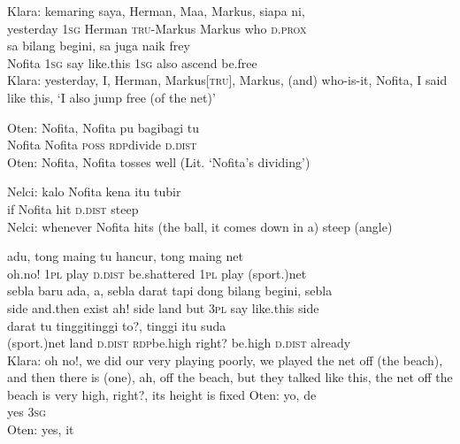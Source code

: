 \ea
\gll   Klara:    {kemaring}    {saya,}    {Herman,}    {Maa,}    {Markus,}   siapa   ni,\\
 {}     {yesterday}    {\textsc{1sg}}    {Herman}    {\textsc{tru-}Markus}    {Markus}   who   \textsc{d.prox}\\
   sa    {bilang}    {begini,}    {sa}   juga    {naik}    {frey}\\
   {Nofita}   \textsc{1sg}    {say}    {like.this}    {\textsc{1sg}}   also    {ascend}    {be.free}\\
\glt
Klara: yesterday, I, Herman, Markus[\textsc{tru}], Markus, (and) who-is-it, Nofita, I said like this, ‘I also jump free (of the net)’
\z

\ea
\gll   Oten:   Nofita,   Nofita   pu   bagi{\Tilde}bagi   tu\\
  {}   Nofita   Nofita   \textsc{poss}   \textsc{rdp}{\Tilde}divide   \textsc{d.dist}\\
\glt
Oten: Nofita, Nofita tosses well (Lit. ‘Nofita’s dividing’)
\z

\ea
\gll   Nelci:   kalo   Nofita   kena   itu   tubir\\
 {}    if   Nofita   hit   \textsc{d.dist}   steep\\
\glt
Nelci: whenever Nofita hits (the ball, it comes down in a) steep (angle)
\z

\ea
{}    {adu,}    {tong}    {maing}    {tu}    {hancur,}    {tong}    {maing}    {net}\\
   {}    {oh.no!}    {\textsc{1pl}}    {play}    {\textsc{d.dist}}    {be.shattered}    {\textsc{1pl}}    {play}    {(sport.)net}\\
\gll  sebla    {baru}    {ada,}    {a,}    {sebla}    {darat}    {tapi}    {dong}    {bilang}    {begini,}   sebla\\
  side    {and.then}    {exist}    {ah!}    {side}    {land}    {but}    {\textsc{3pl}}    {say}    {like.this}   side\\
    {darat}    {tu}    {tinggi{\Tilde}tinggi}    {to?,}    {tinggi}    {itu}    {suda}\\
   {(sport.)net}    {land}    {\textsc{d.dist}}    {\textsc{rdp}{\Tilde}be.high}    {right?}    {be.high}    {\textsc{d.dist}}    {already}\\
\glt
Klara: oh no!, we did our very playing poorly, we played the net off (the beach), and then there is (one), ah, off the beach, but they talked like this, the net off the beach is very high, right?, its height is fixed
\z
\ea
\gll   Oten:   yo,   de\\
  {}   yes   \textsc{3sg}\\
\glt
Oten: yes, it
\z

